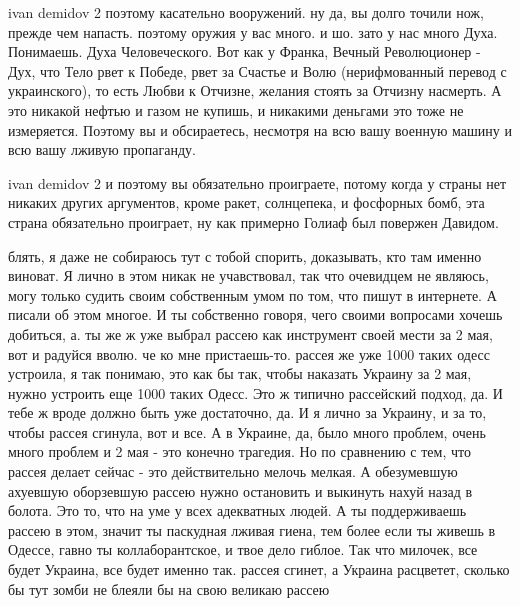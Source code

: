 ivan demidov 2 поэтому касательно вооружений. ну да, вы долго точили нож,
прежде чем напасть. поэтому оружия у вас много. и шо. зато у нас много Духа.
Понимаешь. Духа Человеческого. Вот как у Франка, Вечный Революционер - Дух, что
Тело рвет к Победе, рвет за Счастье и Волю (нерифмованный перевод с
украинского), то есть Любви к Отчизне, желания стоять за Отчизну насмерть. А
это никакой нефтью и газом не купишь, и никакими деньгами это тоже не
измеряется. Поэтому вы и обсираетесь, несмотря на всю вашу военную машину и всю
вашу лживую пропаганду.

ivan demidov 2 и поэтому вы обязательно проиграете, потому когда у страны нет
никаких других аргументов, кроме ракет, солнцепека, и фосфорных бомб, эта
страна обязательно проиграет, ну как примерно Голиаф был повержен Давидом.

блять, я даже не собираюсь тут с тобой спорить, доказывать, кто там именно
виноват. Я лично в этом никак не учавствовал, так что очевидцем не являюсь,
могу только судить своим собственным умом по том, что пишут в интернете. А
писали об этом многое. И ты собственно говоря, чего своими вопросами хочешь
добиться, а. ты же ж уже выбрал рассею как инструмент своей мести за 2 мая, вот
и радуйся вволю. че ко мне пристаешь-то. рассея же уже 1000 таких одесс
устроила, я так понимаю, это как бы так, чтобы наказать Украину за 2 мая, нужно
устроить еще 1000 таких Одесс. Это ж типично рассейский подход, да. И тебе ж
вроде должно быть уже достаточно, да. И я лично за Украину, и за то, чтобы
рассея сгинула, вот и все. А в Украине, да, было много проблем, очень много
проблем и 2 мая - это конечно трагедия. Но по сравнению с тем, что рассея
делает сейчас - это действительно мелочь мелкая. А обезумевшую ахуевшую
оборзевшую рассею нужно остановить и выкинуть нахуй назад в болота. Это то, что
на уме у всех адекватных людей. А ты поддерживаешь рассею в этом, значит ты
паскудная лживая гиена, тем более если ты живешь в Одессе, гавно ты
коллаборантское, и твое дело гиблое. Так что милочек, все будет Украина, все
будет именно так. рассея сгинет, а Украина расцветет, сколько бы тут зомби не
блеяли бы на свою великаю рассею
